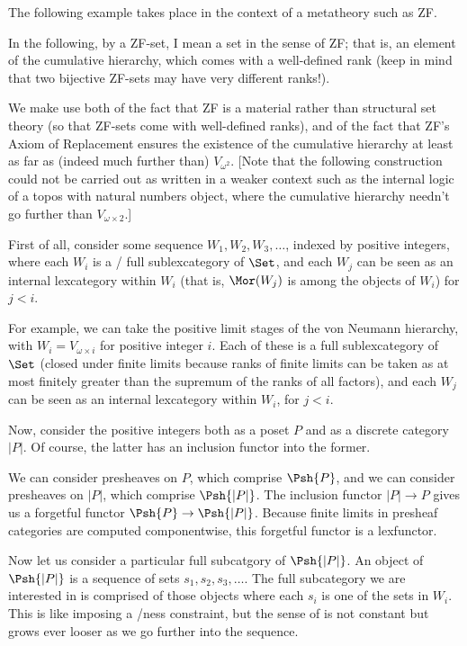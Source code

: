 \begin{construction}
The following example takes place in the context of a metatheory such as ZF.

In the following, by a ZF-set, I mean a set in the sense of ZF; that is, an element of the cumulative hierarchy, which comes with a well-defined rank (keep in mind that two bijective ZF-sets may have very different ranks!).

We make use both of the fact that ZF is a material rather than structural set theory (so that ZF-sets come with well-defined ranks), and of the fact that ZF's Axiom of Replacement ensures the existence of the cumulative hierarchy at least as far as (indeed much further than) $V_{\omega^2}$. [Note that the following construction could not be carried out as written in a weaker context such as the internal logic of a topos with natural numbers object, where the cumulative hierarchy needn't go further than $V_{\omega \times 2}$.]

First of all, consider some sequence $W_1, W_2, W_3, \ldots$, indexed by positive integers, where each $W_i$ is a \setsmall/ full sublexcategory of $\Set$, and each $W_j$ can be seen as an internal lexcategory within $W_i$ (that is, $\Mor(W_j)$ is among the objects of $W_i$) for $j < i$.

For example, we can take the positive limit stages of the von Neumann hierarchy, with $W_i = V_{\omega \times i}$ for positive integer $i$. Each of these is a full sublexcategory of $\Set$ (closed under finite limits because ranks of finite limits can be taken as at most finitely greater than the supremum of the ranks of all factors), and each $W_j$ can be seen as an internal lexcategory within $W_i$, for $j < i$.

Now, consider the positive integers both as a poset $P$ and as a discrete category $|P|$. Of course, the latter has an inclusion functor into the former.

We can consider presheaves on $P$, which comprise $\Psh{P}$, and we can consider presheaves on $|P|$, which comprise $\Psh{|P|}$. The inclusion functor $|P| \to P$ gives us a forgetful functor $\Psh{P} \to \Psh{|P|}$. Because finite limits in presheaf categories are computed componentwise, this forgetful functor is a lexfunctor.

Now let us consider a particular full subcatgory of $\Psh{|P|}$. An object of $\Psh{|P|}$ is a sequence of sets $s_1, s_2, s_3, \ldots$. The full subcategory we are interested in is comprised of those objects where each $s_i$ is one of the sets in $W_i$. This is like imposing a \wordsmall/ness constraint, but the sense of  is not constant but grows ever looser as we go further into the sequence.


\end{construction}

